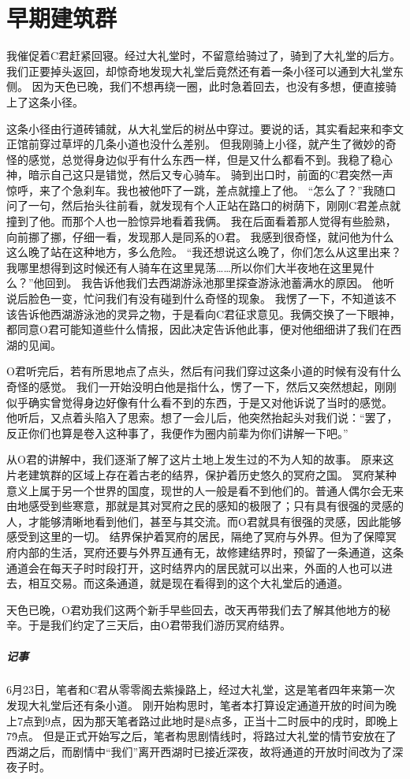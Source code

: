 \chapter{早期建筑群}

我催促着C君赶紧回寝。经过大礼堂时，不留意给骑过了，骑到了大礼堂的后方。
我们正要掉头返回，却惊奇地发现大礼堂后竟然还有着一条小径可以通到大礼堂东侧。
因为天色已晚，我们不想再绕一圈，此时急着回去，也没有多想，便直接骑上了这条小径。


这条小径由行道砖铺就，从大礼堂后的树丛中穿过。要说的话，其实看起来和李文正馆前穿过草坪的几条小道也没什么差别。
但我刚骑上小径，就产生了微妙的奇怪的感觉，总觉得身边似乎有什么东西一样，但是又什么都看不到。我稳了稳心神，暗示自己这只是错觉，然后又专心骑车。
骑到出口时，前面的C君突然一声惊呼，来了个急刹车。我也被他吓了一跳，差点就撞上了他。
“怎么了？”我随口问了一句，然后抬头往前看，就发现有个人正站在路口的树荫下，刚刚C君差点就撞到了他。而那个人也一脸惊异地看着我俩。
我在后面看着那人觉得有些脸熟，向前挪了挪，仔细一看，发现那人是同系的O君。
我感到很奇怪，就问他为什么这么晚了站在这种地方，多么危险。
“我还想说这么晚了，你们怎么从这里出来？我哪里想得到这时候还有人骑车在这里晃荡……所以你们大半夜地在这里晃什么？”他回到。
我告诉他我们去西湖游泳池那里探查游泳池蓄满水的原因。
他听说后脸色一变，忙问我们有没有碰到什么奇怪的现象。
我愣了一下，不知道该不该告诉他西湖游泳池的灵异之物，于是看向C君征求意见。我俩交换了一下眼神，都同意O君可能知道些什么情报，因此决定告诉他此事，便对他细细讲了我们在西湖的见闻。

O君听完后，若有所思地点了点头，然后有问我们穿过这条小道的时候有没有什么奇怪的感觉。
我们一开始没明白他是指什么，愣了一下，然后又突然想起，刚刚似乎确实曾觉得身边好像有什么看不到的东西，于是又对他诉说了当时的感觉。
他听后，又点着头陷入了思索。想了一会儿后，他突然抬起头对我们说：“罢了，反正你们也算是卷入这种事了，我便作为圈内前辈为你们讲解一下吧。”

从O君的讲解中，我们逐渐了解了这片土地上发生过的不为人知的故事。
原来这片老建筑群的区域上存在着古老的结界，保护着历史悠久的冥府之国。
冥府某种意义上属于另一个世界的国度，现世的人一般是看不到他们的。普通人偶尔会无来由地感受到些寒意，那就是其对冥府之民的感知的极限了；只有具有很强的灵感的人，才能够清晰地看到他们，甚至与其交流。而O君就具有很强的灵感，因此能够感受到这里的一切。
结界保护着冥府的居民，隔绝了冥府与外界。但为了保障冥府内部的生活，冥府还要与外界互通有无，故修建结界时，预留了一条通道，这条通道会在每天子时时段打开，这时结界内的居民就可以出来，外面的人也可以进去，相互交易。而这条通道，就是现在看得到的这个大礼堂后的通道。

天色已晚，O君劝我们这两个新手早些回去，改天再带我们去了解其他地方的秘辛。于是我们约定了三天后，由O君带我们游历冥府结界。

\vfill

\paragraph{记事}
6月23日，笔者和C君从零零阁去紫操路上，经过大礼堂，这是笔者四年来第一次发现大礼堂后还有条小道。
刚开始构思时，笔者本打算设定通道开放的时间为晚上7点到9点，因为那天笔者路过此地时是8点多，正当十二时辰中的戌时，即晚上7\~9点。
但是正式开始写之后，笔者构思剧情线时，将路过大礼堂的情节安放在了西湖之后，而剧情中“我们”离开西湖时已接近深夜，故将通道的开放时间改为了深夜子时。
